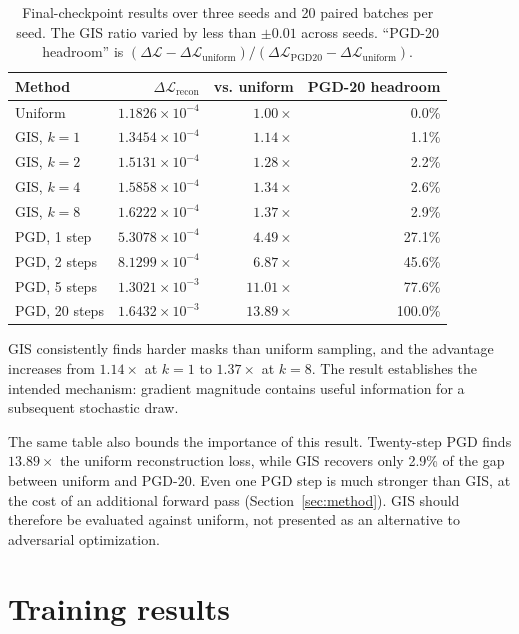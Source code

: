 \documentclass[11pt]{article}
\begin{document}
\begin{table}[ht]
\centering
\small
\begin{tabular}{lrrr}
\toprule
Method & $\Delta\mathcal L_{\mathrm{recon}}$ & vs. uniform & PGD-20 headroom \\
\midrule
Uniform       & $1.1826\times10^{-4}$ & $1.00\times$ & 0.0\% \\
GIS, $k=1$    & $1.3454\times10^{-4}$ & $1.14\times$ & 1.1\% \\
GIS, $k=2$    & $1.5131\times10^{-4}$ & $1.28\times$ & 2.2\% \\
GIS, $k=4$    & $1.5858\times10^{-4}$ & $1.34\times$ & 2.6\% \\
GIS, $k=8$    & $1.6222\times10^{-4}$ & $1.37\times$ & 2.9\% \\
\midrule
PGD, 1 step   & $5.3078\times10^{-4}$ & $4.49\times$ & 27.1\% \\
PGD, 2 steps  & $8.1299\times10^{-4}$ & $6.87\times$ & 45.6\% \\
PGD, 5 steps  & $1.3021\times10^{-3}$ & $11.01\times$ & 77.6\% \\
PGD, 20 steps & $1.6432\times10^{-3}$ & $13.89\times$ & 100.0\% \\
\bottomrule
\end{tabular}
\caption{Final-checkpoint results over three seeds and 20 paired batches per seed.
The GIS ratio varied by less than $\pm0.01$ across seeds. ``PGD-20 headroom'' is
$(\Delta\mathcal L-\Delta\mathcal L_{\mathrm{uniform}})/
(\Delta\mathcal L_{\mathrm{PGD20}}-\Delta\mathcal L_{\mathrm{uniform}})$.}
\label{tab:benchmark}
\end{table}

GIS consistently finds harder masks than uniform sampling, and the advantage increases
from $1.14\times$ at $k=1$ to $1.37\times$ at $k=8$. The result establishes the intended
mechanism: gradient magnitude contains useful information for a subsequent stochastic
draw.

The same table also bounds the importance of this result. Twenty-step PGD finds
$13.89\times$ the uniform reconstruction loss, while GIS recovers only 2.9\% of the
gap between uniform and PGD-20. Even one PGD step is much stronger than GIS, at the cost
of an additional forward pass (Section~\ref{sec:method}). GIS should therefore be evaluated against uniform, not
presented as an alternative to adversarial optimization.

\section{Training results}
\end{document}
